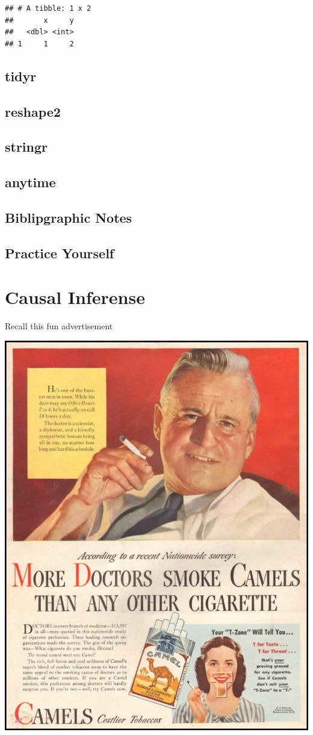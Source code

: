 \documentclass[]{book}
\theoremstyle{definition}
\theoremstyle{definition}
\theoremstyle{definition}
\theoremstyle{remark}
\begin{document}
\begin{verbatim}
## # A tibble: 1 x 2
##       x     y
##   <dbl> <int>
## 1     1     2
\end{verbatim}

\section{tidyr}\label{tidyr}

\section{reshape2}\label{reshape2}

\section{stringr}\label{stringr}

\section{anytime}\label{anytime}

\section{Biblipgraphic Notes}\label{biblipgraphic-notes}

\section{Practice Yourself}\label{practice-yourself-17}

\chapter{Causal Inferense}\label{causality}

Recall this fun advertisement

\includegraphics[width=0.5\linewidth]{art/wor}
\end{document}
